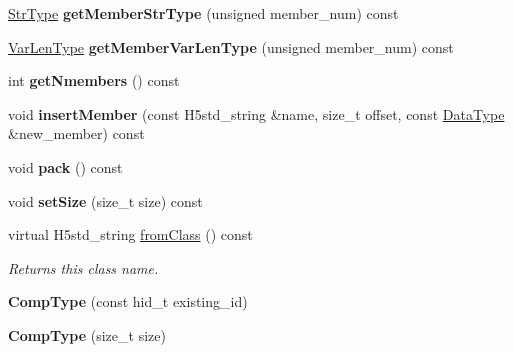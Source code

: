 \begin{DoxyCompactItemize}
\hyperlink{class_h5_1_1_str_type}{Str\+Type} {\bfseries get\+Member\+Str\+Type} (unsigned member\+\_\+num) const
\item 
\mbox{\label{class_h5_1_1_comp_type_acaa28388929b7b2041d5b0fc57c9aadb}} 
\hyperlink{class_h5_1_1_var_len_type}{Var\+Len\+Type} {\bfseries get\+Member\+Var\+Len\+Type} (unsigned member\+\_\+num) const
\item 
\mbox{\label{class_h5_1_1_comp_type_ad90c401dfdc0c6d44e22f25c358c2ae0}} 
int {\bfseries get\+Nmembers} () const
\item 
\mbox{\label{class_h5_1_1_comp_type_a5ccddf9f47c8d9007b1be6dad4385935}} 
void {\bfseries insert\+Member} (const H5std\+\_\+string \&name, size\+\_\+t offset, const \hyperlink{class_h5_1_1_data_type}{Data\+Type} \&new\+\_\+member) const
\item 
\mbox{\label{class_h5_1_1_comp_type_adf67d04d2ee4ce4ff4d3e928dc22c11e}} 
void {\bfseries pack} () const
\item 
\mbox{\label{class_h5_1_1_comp_type_a4a125fd16425a78eb5990214749fa387}} 
void {\bfseries set\+Size} (size\+\_\+t size) const
\item 
\mbox{\label{class_h5_1_1_comp_type_a2413f08e41c809f5cc1a9f3ea9fe32fd}} 
virtual H5std\+\_\+string \hyperlink{class_h5_1_1_comp_type_a2413f08e41c809f5cc1a9f3ea9fe32fd}{from\+Class} () const
\begin{DoxyCompactList}\small\item\em Returns this class name. \end{DoxyCompactList}\item 
\mbox{\label{class_h5_1_1_comp_type_a5cad9616c8cc3320bb256bf4de7c1bbd}} 
{\bfseries Comp\+Type} (const hid\+\_\+t existing\+\_\+id)
\item 
\mbox{\label{class_h5_1_1_comp_type_ac2ad859ac5c8082158ca2db8c888106f}} 
{\bfseries Comp\+Type} (size\+\_\+t size)
\item 
\mbox{\label{class_h5_1_1_comp_type_ad928c3cb8ecffb34588c4f4558157250}} 

\end{DoxyCompactItemize}
